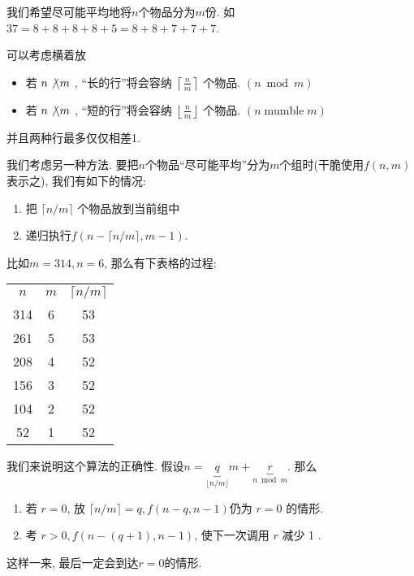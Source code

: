 \documentclass{ctexart}
\begin{document}
\begin{example}
    我们希望尽可能平均地将$n$个物品分为$m$份. 如$37=8+8+8+8+5=8+8+7+7+7$. 


    可以考虑横着放
    \begin{itemize}
        \item 若 $n \not\backslash m$ , “长的行”将会容纳 $\left\lceil\frac{n}{m}\right\rceil$ 个物品. $(n \bmod m)$
        \item 若 $n \not\backslash m$ , “短的行”将会容纳 $\left\lfloor\frac{n}{m}\right\rfloor$ 个物品. $(n \operatorname{mumble} m)$
    \end{itemize}
    并且两种行最多仅仅相差1. 

    我们考虑另一种方法. 要把$n$个物品“尽可能平均”分为$m$个组时(干脆使用$f(n,m)$表示之),  我们有如下的情况: 
    \begin{enumerate}
        \item 把 $\lceil n / m\rceil$ 个物品放到当前组中
        \item 递归执行$f(n-\lceil n / m\rceil, m-1)$. 
    \end{enumerate}

    比如$m=314, n=6$, 那么有下表格的过程: 

    \begin{center}
        \begin{tabular}{|ccc|}
\hline$n$ & $m$ & $\lceil n / m\rceil$ \\
314 & 6 & 53 \\
261 & 5 & 53 \\
208 & 4 & 52 \\
156 & 3 & 52 \\
104 & 2 & 52 \\
52 & 1 & 52 \\
\hline
\end{tabular}
    \end{center}


    我们来说明这个算法的正确性. 假设$n=\underbrace{q}_{\lfloor n/m \rfloor} m+\underbrace{r}_{n\bmod m}$. 那么
    \begin{enumerate}
        \item 若 $r=0$, 放 $\lceil n / m\rceil=q, f(n-q, n-1)$仍为 $r=0$ 的情形. 
        \item 考 $r>0, f(n-(q+1), n-1)$, 使下一次调用 $r$ 减少 1 .
    \end{enumerate}

    这样一来, 最后一定会到达$r=0$的情形. 


\end{example}
\end{document}
